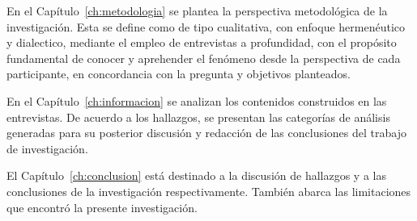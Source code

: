 En el Capítulo~\ref{ch:metodologia} se plantea la perspectiva metodológica de la
investigación. Esta se define como de tipo cualitativa, con enfoque hermenéutico
y dialectico, mediante el empleo de entrevistas a profundidad, con el
propósito fundamental de conocer y aprehender el fenómeno desde la perspectiva
de cada participante, en concordancia con la pregunta y objetivos planteados.

En el Capítulo~\ref{ch:informacion} se analizan los contenidos construidos en
las entrevistas. De acuerdo a los hallazgos, se presentan las categorías de
análisis generadas para su posterior discusión y redacción de las conclusiones
del trabajo de investigación.

El Capítulo~\ref{ch:conclusion} está destinado a la discusión de hallazgos y a
las conclusiones de la investigación respectivamente. También abarca las
limitaciones que encontró la presente investigación.

